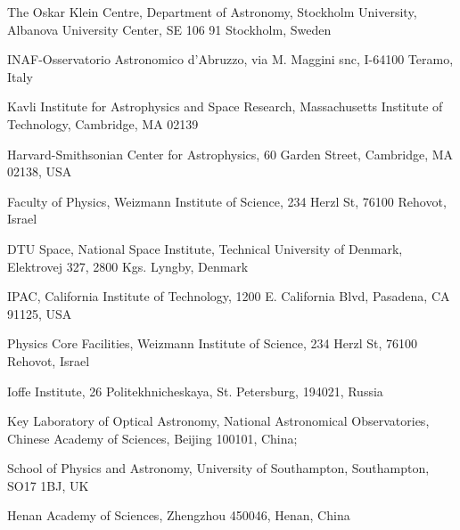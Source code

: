 \documentclass{nature_plusfigure}
\renewcommand{\thefootnote}{\textit{\alph{footnote}}}
\renewcommand{\thefootnote}{\fnsymbol{footnote}}
\begin{document}
\begin{small}
\begin{affiliations}
\item The Oskar Klein Centre, Department of Astronomy, Stockholm University, Albanova University Center, SE 106 91 Stockholm, Sweden
\item INAF-Osservatorio Astronomico d’Abruzzo, via M. Maggini snc, I-64100 Teramo, Italy
\item Kavli Institute for Astrophysics and Space Research, Massachusetts Institute of Technology, Cambridge, MA 02139
\item Harvard-Smithsonian Center for Astrophysics, 60 Garden Street, Cambridge, MA 02138, USA
\item Faculty of Physics, Weizmann Institute of Science, 234 Herzl St, 76100 Rehovot, Israel
\item DTU Space, National Space Institute, Technical University of Denmark, Elektrovej 327, 2800 Kgs. Lyngby, Denmark
\item IPAC, California Institute of Technology, 1200 E. California Blvd, Pasadena, CA 91125, USA
\item Physics Core Facilities, Weizmann Institute of Science, 234 Herzl St, 76100 Rehovot, Israel
\item Ioffe Institute, 26 Politekhnicheskaya, St. Petersburg, 194021, Russia
\item Key Laboratory of Optical Astronomy, National Astronomical Observatories, Chinese Academy of Sciences, Beĳing 100101, China; 
\item School of Physics and Astronomy, University of Southampton, Southampton, SO17 1BJ, UK
\item Henan Academy of Sciences, Zhengzhou 450046, Henan, China

\end{affiliations}
\end{small}

 
\renewcommand{\thefootnote}{\textit{\alph{footnote}}}
\newcommand{\arcdeg}{\mbox{$^\circ$}}
\newcommand{\arcsec}{$^{\prime\prime}$}
\newcommand{\arcmin}{$^{\prime}$}
\newcommand{\Msol}{\mbox{$M\raisebox{-.6ex}{\odot}$}}
\newcommand\brobor{\smash[b]{\raisebox{0.6\height}{\scalebox{0.5}{\tiny(}}{\mkern-1.5mu\scriptstyle-\mkern-1.5mu}\raisebox{0.6\height}{\scalebox{0.5}{\tiny)}}}}
\captionsetup[table]{name=Table}
\end{document}
